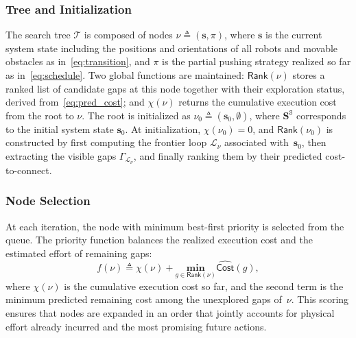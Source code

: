 \subsubsection{Tree and Initialization}
The search tree $\mathcal{T}$ is composed of nodes
$\nu\triangleq(\mathbf{s},\pi)$, where $\mathbf{s}$ is the current system
state including the positions and orientations of all robots and movable
obstacles as in~\eqref{eq:transition}, and $\pi$ is the partial pushing
strategy realized so far as in~\eqref{eq:schedule}. Two global functions are
maintained: $\mathsf{Rank}(\nu)$ stores a ranked list of candidate gaps at this
node together with their exploration status, derived from~\eqref{eq:pred_cost};
and $\chi(\nu)$ returns the cumulative execution cost
from the root to $\nu$.
The root is initialized as
$\nu_0\triangleq(\mathbf{s}_0,\emptyset)$, where
$\mathbf{S}^{\texttt{S}}$ corresponds to the initial system state
$\mathbf{s}_0$. At initialization, $\chi(\nu_0)=0$, and
$\mathsf{Rank}(\nu_0)$ is constructed by first computing the frontier loop
$\mathcal{L}_\nu$ associated with~$\mathbf{s}_0$, then extracting the visible
gaps $\Gamma_{\mathcal{L}_\nu}$, and finally ranking them by their predicted
cost-to-connect.

\subsubsection{Node Selection}
At each iteration, the node with minimum best-first priority is selected from
the queue. The priority function balances the realized execution cost and the
estimated effort of remaining gaps:
\begin{equation}\label{eq:priority}
  f(\nu)\triangleq \chi(\nu)+\underset{g\in \textsf{Rank}(\nu)}{\textbf{min}}
  \widehat{\mathsf{Cost}}(g),
\end{equation}
where $\chi(\nu)$ is the cumulative execution cost so far, and the second term
is the minimum predicted remaining cost among the unexplored gaps of~$\nu$.
This scoring ensures that nodes are expanded in an order that jointly accounts
for physical effort already incurred and the most promising future actions.


